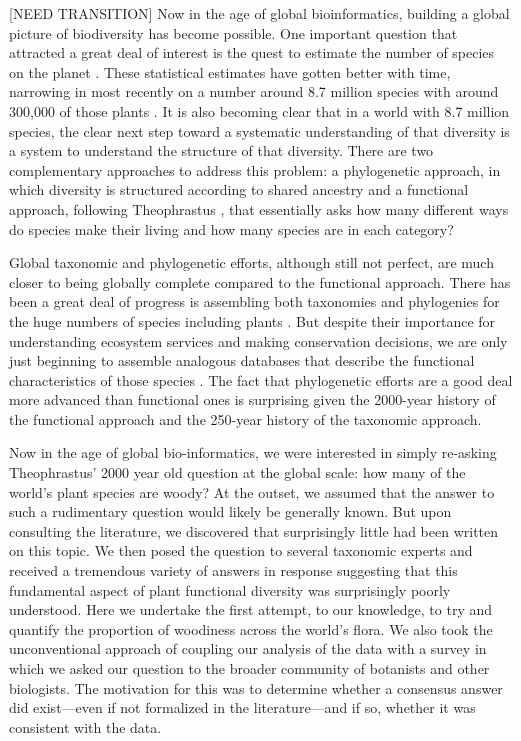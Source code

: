 \documentclass[12pt]{article}
\begin{document}
[NEED TRANSITION] Now in the age of global bioinformatics, building a global picture of biodiversity has become possible.  One important question that attracted a great deal of interest is the quest to estimate the number of species on the planet \citep{may1988many,erwin1991many, stork1993many, mora2011plos}.  These statistical estimates have gotten better with time, narrowing in most recently on a number around 8.7 million species with around 300,000 of those plants \citep{mora2011plos}.  It is also becoming clear that in a world with 8.7 million species, the clear next step toward a systematic understanding of that diversity is a system to understand the structure of that diversity. There are two complementary approaches to address this problem: a phylogenetic approach, in which diversity is structured according to shared ancestry and a functional approach, following Theophrastus \citep[more recently in the tradition of][]{grime1979plant, weiher2009challenging, westoby2002plant}, that essentially asks how many different ways do species make their living and how many species are in each category?

Global taxonomic and phylogenetic efforts, although still not perfect, are much closer to being globally complete compared to the functional approach.   There has been a great deal of progress is assembling both taxonomies and phylogenies for the huge numbers of species including plants \citep[e.g.][]{smith2011understanding}. But despite their importance for understanding ecosystem services and making conservation decisions, we are only just beginning to assemble analogous databases that describe the functional characteristics of those species \citep{Kattge2011TRY}. The fact that phylogenetic efforts are a good deal more advanced than functional ones is surprising given the 2000-year history of the functional approach and the 250-year history of the taxonomic approach.  


Now in the age of global bio-informatics, we were interested in simply re-asking Theophrastus' 2000 year old question at the global scale: how many of the world's plant species are woody? At the outset, we assumed that the answer to such a rudimentary question would likely be generally known. But upon consulting the literature, we discovered that surprisingly little had been written on this topic. We then posed the question to several taxonomic experts and received a tremendous variety of answers in response suggesting that this fundamental aspect of plant functional diversity was surprisingly poorly understood. Here we undertake the first attempt, to our knowledge, to try and quantify the proportion of woodiness across the world's flora. We also took the unconventional approach of coupling our analysis of the data with a survey in which we asked our question to the broader community of botanists and other biologists. The motivation for this was to determine whether a consensus answer did exist---even if not formalized in the literature---and if so, whether it was consistent with the data.
\end{document}
